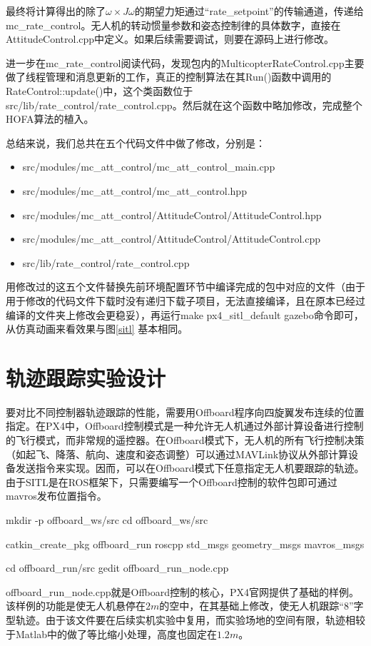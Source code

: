 最终将计算得出的除了$\omega \times J\omega$的期望力矩通过“rate\_setpoint”的传输通道，传递给mc\_rate\_control。无人机的转动惯量参数和姿态控制律的具体数字，直接在AttitudeControl.cpp中定义。如果后续需要调试，则要在源码上进行修改。

进一步在mc\_rate\_control阅读代码，发现包内的MulticopterRateControl.cpp主要做了线程管理和消息更新的工作，真正的控制算法在其Run()函数中调用的RateControl::update()中，这个类函数位于src/lib/rate\_control/rate\_control.cpp。然后就在这个函数中略加修改，完成整个HOFA算法的植入。

总结来说，我们总共在五个代码文件中做了修改，分别是：
\begin{itemize}
  \item src/modules/mc\_att\_control/mc\_att\_control\_main.cpp
  \item src/modules/mc\_att\_control/mc\_att\_control.hpp
  \item src/modules/mc\_att\_control/AttitudeControl/AttitudeControl.hpp
  \item src/modules/mc\_att\_control/AttitudeControl/AttitudeControl.cpp
  \item src/lib/rate\_control/rate\_control.cpp
\end{itemize}
用修改过的这五个文件替换先前环境配置环节中编译完成的包中对应的文件（由于用于修改的代码文件下载时没有递归下载子项目，无法直接编译，且在原本已经过编译的文件夹上修改会更稳妥），再运行make px4\_sitl\_default gazebo命令即可，从仿真动画来看效果与图\ref{sitl} 基本相同。



\section{轨迹跟踪实验设计}
要对比不同控制器轨迹跟踪的性能，需要用Offboard程序向四旋翼发布连续的位置指定。在PX4中，Offboard控制模式是一种允许无人机通过外部计算设备进行控制的飞行模式，而非常规的遥控器。在Offboard模式下，无人机的所有飞行控制决策（如起飞、降落、航向、速度和姿态调整）可以通过MAVLink协议从外部计算设备发送指令来实现。因而，可以在Offboard模式下任意指定无人机要跟踪的轨迹。
由于SITL是在ROS框架下，只需要编写一个Offboard控制的软件包即可通过mavros发布位置指令。
\begin{codeblock}[language=C]
  mkdir -p offboard_ws/src
  cd offboard_ws/src

  catkin_create_pkg offboard_run roscpp std_msgs geometry_msgs mavros_msgs
  
  cd offboard_run/src
  gedit offboard_run_node.cpp
\end{codeblock}
offboard\_run\_node.cpp就是Offboard控制的核心，PX4官网提供了基础的样例\cite{px4}。该样例的功能是使无人机悬停在$2m$的空中，在其基础上修改，使无人机跟踪“8”字型轨迹。由于该文件要在后续实机实验中复用，而实验场地的空间有限，轨迹相较于Matlab中的做了等比缩小处理，高度也固定在$1.2m$。

